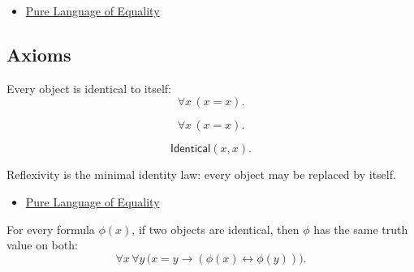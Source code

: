 
\begin{dependencies}
\begin{itemize}
  \item \hyperref[def:axiomatic-equality-language]{Pure Language of Equality}
\end{itemize}
\end{dependencies}

\subsection{Axioms}

\begin{axiombox}{}
\begin{axiom}\label{ax:axiomatic-equality-reflexivity}
Every object is identical to itself:
\[
  \forall x\,(x=x).
\]
\end{axiom}
\end{axiombox}

\begin{remark*}
\[
  \forall x\,(x=x).
\]
\end{remark*}

\begin{remark*}
\[
  \mathsf{Identical}(x,x).
\]
\end{remark*}

\begin{remark*}[Interpretation]
Reflexivity is the minimal identity law: every object may be replaced by
itself.
\end{remark*}

\begin{dependencies}
\begin{itemize}
  \item \hyperref[def:axiomatic-equality-language]{Pure Language of Equality}
\end{itemize}
\end{dependencies}

\begin{axiombox}{}
\begin{axiom}\label{ax:axiomatic-equality-substitution}
For every formula \(\phi(x)\), if two objects are identical, then \(\phi\) has
the same truth value on both:
\[
  \forall x\,\forall y\,
  \bigl(x=y\to(\phi(x)\leftrightarrow\phi(y))\bigr).
\]
\end{axiom}
\end{axiombox}

